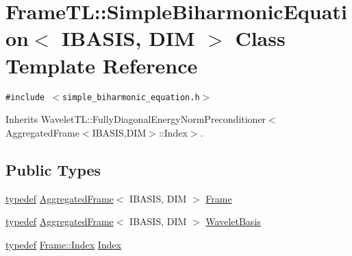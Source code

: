 \hypertarget{classFrameTL_1_1SimpleBiharmonicEquation}{
\section{FrameTL::SimpleBiharmonicEquation$<$ IBASIS, DIM $>$ Class Template Reference}
\label{classFrameTL_1_1SimpleBiharmonicEquation}
}
{\tt \#include $<$simple\_\-biharmonic\_\-equation.h$>$}

Inherits WaveletTL::FullyDiagonalEnergyNormPreconditioner$<$AggregatedFrame$<$IBASIS,DIM$>$::Index$>$.

\subsection*{Public Types}
\begin{CompactItemize}
\item 
\hyperlink{structtypedef}{typedef} \hyperlink{classFrameTL_1_1AggregatedFrame}{AggregatedFrame}$<$ IBASIS, DIM $>$ \hyperlink{classFrameTL_1_1SimpleBiharmonicEquation_b92f00909f0e7a185bcdede446570546}{Frame}
\item 
\hyperlink{structtypedef}{typedef} \hyperlink{classFrameTL_1_1AggregatedFrame}{AggregatedFrame}$<$ IBASIS, DIM $>$ \hyperlink{classFrameTL_1_1SimpleBiharmonicEquation_feee9bcf85adb1115a5487773a5d8d32}{WaveletBasis}
\item 
\hyperlink{structtypedef}{typedef} \hyperlink{classFrameTL_1_1FrameIndex}{Frame::Index} \hyperlink{classFrameTL_1_1SimpleBiharmonicEquation_35f42b79db1b8e156c3cdb3c22122e74}{Index}
\end{CompactItemize}
